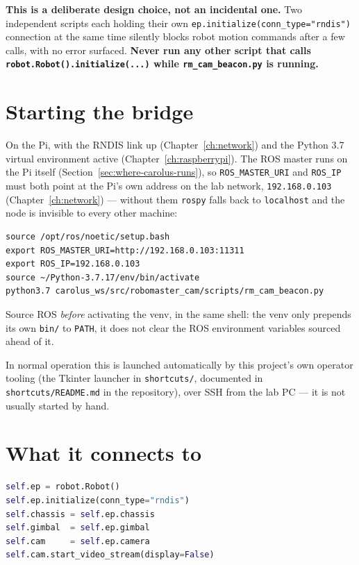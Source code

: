 \documentclass[11pt]{report}
\begin{document}
\textbf{This is a deliberate design choice, not an incidental one.} Two
independent scripts each holding their own
\texttt{ep.initialize(conn\_type="rndis")} connection at the same time
silently blocks robot motion commands after a few calls, with no error
surfaced. \textbf{Never run any other script that calls
\texttt{robot.Robot().initialize(...)} while \texttt{rm\_cam\_beacon.py} is
running.}

\section{Starting the bridge}

On the Pi, with the RNDIS link up (Chapter~\ref{ch:network}) and the Python
3.7 virtual environment active (Chapter~\ref{ch:raspberrypi}). The ROS
master runs on the Pi itself (Section~\ref{sec:where-carolus-runs}), so
\texttt{ROS\_MASTER\_URI} and \texttt{ROS\_IP} must both point at the Pi's
own address on the lab network, \texttt{192.168.0.103}
(Chapter~\ref{ch:network}) --- without them \texttt{rospy} falls back to
\texttt{localhost} and the node is invisible to every other machine:

\begin{lstlisting}[style=shell]
source /opt/ros/noetic/setup.bash
export ROS_MASTER_URI=http://192.168.0.103:11311
export ROS_IP=192.168.0.103
source ~/Python-3.7.17/env/bin/activate
python3.7 carolus_ws/src/robomaster_cam/scripts/rm_cam_beacon.py
\end{lstlisting}

Source ROS \emph{before} activating the venv, in the same shell: the venv
only prepends its own \texttt{bin/} to \texttt{PATH}, it does not clear the
ROS environment variables sourced ahead of it.

In normal operation this is launched automatically by this project's own
operator tooling (the Tkinter launcher in \texttt{shortcuts/}, documented in
\texttt{shortcuts/README.md} in the repository), over SSH from the lab PC
--- it is not usually started by hand.

\section{What it connects to}

\begin{lstlisting}[style=code,language=Python]
self.ep = robot.Robot()
self.ep.initialize(conn_type="rndis")
self.chassis = self.ep.chassis
self.gimbal  = self.ep.gimbal
self.cam     = self.ep.camera
self.cam.start_video_stream(display=False)
\end{lstlisting}
\end{document}
